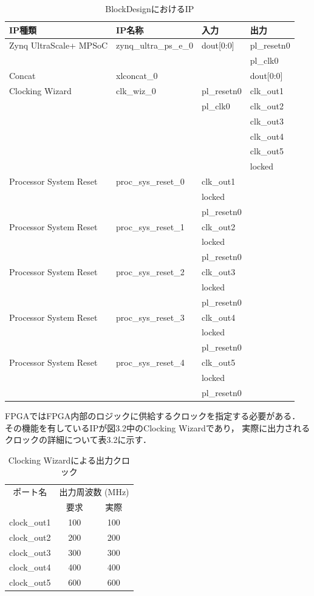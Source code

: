 \documentclass[11pt,a4j]{jreport}
\begin{document}
\begin{table}[H]
  \caption{BlockDesignにおけるIP}
  \label{table:SpeedOfLight}
  \centering
   \begin{tabular}{llll}
    \hline
    IP種類 & IP名称 & 入力 & 出力 \\
    \hline \hline
    Zynq UltraScale+ MPSoC & zynq_ultra_ps_e_0 & dout[0:0] & pl_resetn0 \\
    & & & pl_clk0 \\
    \hline
    Concat & xlconcat_0 & & dout[0:0] \\
    \hline
    Clocking Wizard & clk_wiz_0 & pl_resetn0 & clk_out1 \\
    & & pl_clk0 & clk_out2 \\
    & & & clk_out3 \\
    & & & clk_out4 \\
    & & & clk_out5 \\
    & & & locked \\
    \hline
    Processor System Reset & proc_sys_reset_0 & clk_out1 & \\
    & & locked & \\
    & & pl_resetn0 & \\
    \hline
    Processor System Reset & proc_sys_reset_1 & clk_out2 & \\
    & & locked & \\
    & & pl_resetn0 & \\
    \hline
    Processor System Reset & proc_sys_reset_2 & clk_out3 & \\
    & & locked & \\
    & & pl_resetn0 & \\
    \hline
    Processor System Reset & proc_sys_reset_3 & clk_out4 & \\
    & & locked & \\
    & & pl_resetn0 & \\
    \hline
    Processor System Reset & proc_sys_reset_4 & clk_out5 & \\
    & & locked & \\
    & & pl_resetn0 & \\
  \hline
  \end{tabular}
\end{table}
FPGAではFPGA内部のロジックに供給するクロックを指定する必要がある．
その機能を有しているIPが図3.2中のClocking Wizardであり，
実際に出力されるクロックの詳細について表3.2に示す．
\begin{table}[H]
  \caption{Clocking Wizardによる出力クロック}
  \label{physics}
  \centering
  \begin{tabular}{ccc}
    \hline
    ポート名 & \multicolumn{2}{c}{出力周波数 (MHz)} \\
    \cmidrule(lr){2-3}
     & 要求 & 実際 \\
    \hline
    clock_out1 & 100 & 100 \\
    clock_out2 & 200 & 200 \\
    clock_out3 & 300 & 300 \\
    clock_out4 & 400 & 400 \\
    clock_out5 & 600 & 600 \\
    \hline
    \end{tabular}
\end{table}
\end{document}
